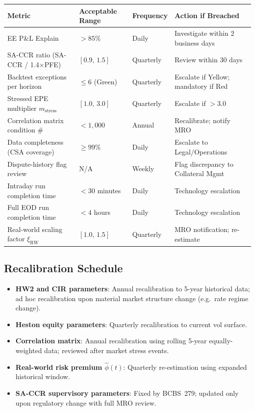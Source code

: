 \documentclass[11pt,a4paper]{article}
\begin{document}
\begin{longtable}{@{}llll@{}}
\toprule
\textbf{Metric} & \textbf{Acceptable Range} & \textbf{Frequency} & \textbf{Action if Breached} \\
\midrule
\endhead
\bottomrule
\endfoot
EE P\&L Explain                & $>85\%$           & Daily    & Investigate within 2 business days \\
SA-CCR ratio (SA-CCR / 1.4$\times$PFE) & $[0.9,\, 1.5]$  & Quarterly & Review within 30 days \\
Backtest exceptions per horizon & $\leq 6$ (Green)  & Quarterly & Escalate if Yellow; mandatory if Red \\
Stressed EPE multiplier $m_{\text{stress}}$ & $[1.0,\, 3.0]$ & Quarterly & Escalate if $>3.0$ \\
Correlation matrix condition \# & $<1{,}000$        & Annual   & Recalibrate; notify MRO \\
Data completeness (CSA coverage) & $\geq 99\%$       & Daily    & Escalate to Legal/Operations \\
Dispute-history flag review     & N/A               & Weekly   & Flag discrepancy to Collateral Mgmt \\
Intraday run completion time    & $<30$ minutes      & Daily    & Technology escalation \\
Full EOD run completion time    & $<4$ hours         & Daily    & Technology escalation \\
Real-world scaling factor $\xi_{\text{RW}}$ & $[1.0,\, 1.5]$ & Quarterly & MRO notification; re-estimate \\
\end{longtable}

\subsection{Recalibration Schedule}

\begin{itemize}[noitemsep]
  \item \textbf{HW2 and CIR parameters}: Annual recalibration to 5-year
        historical data; ad hoc recalibration upon material market structure
        change (e.g.\ rate regime change).
  \item \textbf{Heston equity parameters}: Quarterly recalibration to current
        vol surface.
  \item \textbf{Correlation matrix}: Annual recalibration using rolling 5-year
        equally-weighted data; reviewed after market stress events.
  \item \textbf{Real-world risk premium $\hat{\phi}(t)$}: Quarterly
        re-estimation using expanded historical window.
  \item \textbf{SA-CCR supervisory parameters}: Fixed by BCBS~279; updated
        only upon regulatory change with full MRO review.
\end{itemize}
\end{document}
